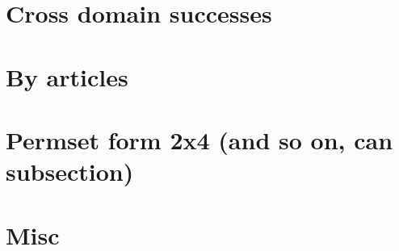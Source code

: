 
\label{ch:results}
\section{Cross domain successes}
\section{By articles}
\section{Permset form 2x4 (and so on, can subsection)}
\section{Misc}